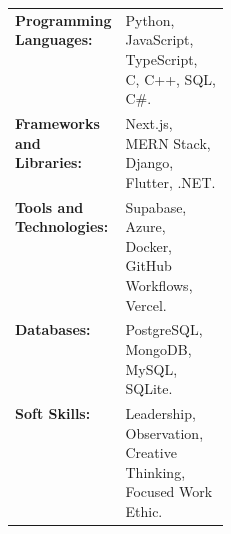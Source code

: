 \documentclass[10pt, a4paper]{article}
\begin{document}
\renewcommand{\arraystretch}{} %
\setlength{\extrarowheight}{0.11 cm} %
\begin{tabularx}{\textwidth}{>{\raggedright\arraybackslash}p{0.25\linewidth}>{\raggedright\arraybackslash}X}
    \textbf{Programming Languages:}    & Python, JavaScript, TypeScript, C, C++, SQL, C\#.               \\
    \textbf{Frameworks and Libraries:} & Next.js, MERN Stack, Django, Flutter, .NET.                     \\
    \textbf{Tools and Technologies:}   & Supabase, Azure, Docker, GitHub Workflows, Vercel.              \\
    \textbf{Databases:}                & PostgreSQL, MongoDB, MySQL, SQLite.                             \\
    \textbf{Soft Skills:}              & Leadership, Observation, Creative Thinking, Focused Work Ethic. \\
\end{tabularx}


\end{document}
